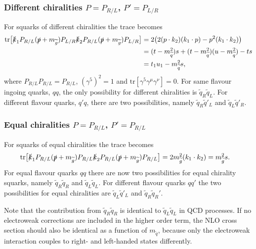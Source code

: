 \documentclass[twoside,english]{uiofysmaster}
\begin{document}
{\subsubsection{Different chiralities $P=P_{R/L}$, $P'=P_{L/R}$}
For squarks of different chiralities the trace becomes
\begin{align*}
\text{tr} \big[ 
\slashed{k}_1 P_{R/L} (\slashed{p} + m_{\widetilde{g}}) P_{L/R} \slashed{k}_2 P_{R/L} (\slashed{p} + m_{\widetilde{g}}) P_{L/R} \big]
&= 2 \big(
2 (p \cdot k_2) (k_1 \cdot p) - p^2 (k_1 \cdot k_2)\big)\\
& = (t-m_{\widetilde{q}}^2)s + (t-m_{\widetilde{q}}^2)(u-m_{\widetilde{q}}^2)-  ts\\
&=  t_1u_1 -m_{\widetilde{q}}^2s,
\end{align*}
where $P_{R/L}P_{R/L} = P_{R/L}$, $(\gamma^5)^2 = 1$ and $\text{tr}[\gamma^5 \gamma^{\mu} \gamma^{\nu}]=0$. For same flavour ingoing quarks, $qq$, the only possibility for different chiralities is $\widetilde{q}_R\widetilde{q}_L$. For different flavour quarks, $q'q$, there are two possibilities, namely $ \widetilde{q}_R \widetilde{q}'_L$ and $\widetilde{q}_L \widetilde{q}'_R$.  


\subsubsection{Equal chiralities $P=P_{R/L}$, $P'=P_{R/L}$}
For squarks of equal chiralities the trace becomes
\begin{align*}
\text{tr} \big[ 
\slashed{k}_1 P_{R/L} (\slashed{p} + m_{\widetilde{g}}) P_{R/L} \slashed{k}_2 P_{R/L} (\slashed{p} + m_{\widetilde{g}}) P_{R/L} \big]&= 2  m_{\widetilde{g}}^2 (k_1 \cdot k_2)= m_{\widetilde{g}}^2 s.
\end{align*}
For equal flavour quarks $qq$ there are now two possibilities for equal chirality squarks, namely $\widetilde{q}_R \widetilde{q}_R$ and $ \widetilde{q}_L \widetilde{q}_L$. For different flavour quarks $qq'$ the two possibilities for equal chiralities are $ \widetilde{q}_L \widetilde{q}'_L$ and $\widetilde{q}_R \widetilde{q}_R'$. 

Note that the contribution from $\widetilde{q}_R \widetilde{q}_R$ is identical to $\widetilde{q}_L \widetilde{q}_L$ in QCD processes. If no electroweak corrections are included in the higher order term, the NLO cross section should also be identical as a function of $m_{\widetilde{q}}$, because only the electroweak interaction couples to right- and left-handed states differently. 

}
\end{document}
